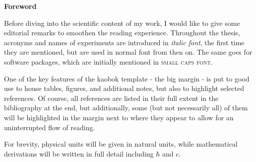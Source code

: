 
\thispagestyle{plain}
\begin{minipage}[c][0.4\textheight][b]{0.9\textwidth}
    \huge
    \textbf{Foreword}
    \normalsize
    \par
    \vspace{1.0cm}
    Before diving into the scientific content of my work, I would like to give some editorial remarks to smoothen the reading experience. Throughout the thesis, acronyms and names of experiments are introduced in \textit{italic font}, the first time they are mentioned, but are used in normal font from then on. The same goes for software packages, which are initially mentioned in \textsc{small caps font}.
    
    \par
    \vspace{0.2cm}
    
    One of the key features of the kaobok template - the big margin - is put to good use to house tables, figures, and additional notes, but also to highlight selected references. Of course, all references are listed in their full extent in the bibliography at the end, but additionally, some (but not necessarily all) of them will be highlighted in the margin next to where they appear to allow for an uninterrupted flow of reading.
    
    \par
    \vspace{0.2cm}
    
    For brevity, physical units will be given in natural units, while mathematical derivations will be written in full detail including $\hbar$ and $c$.
\end{minipage}
